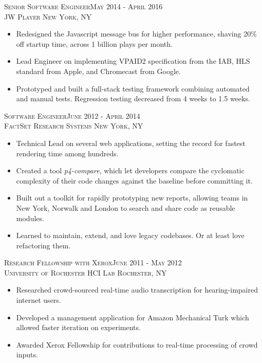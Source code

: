\textsc{Senior Software Engineer\hfill May 2014 - April 2016\\}
\textsc{JW Player \hfill New York, NY\\}
\begin{itemize}
	\setlength{\itemsep}{1pt}
	\setlength{\itemsep}{1pt}
	\setlength{\parskip}{0pt}
	\setlength{\parsep}{0pt}
	\setlength{\leftmargin}{-5mm}
        \item Redesigned the Javascript message bus for higher performance, shaving 20\% off startup time, across 1 billion plays per month.
        \item Lead Engineer on implementing VPAID2 specification from the IAB, HLS standard from Apple, and Chromecast from Google.
        \item Prototyped and built a full-stack testing framework combining automated and manual tests. Regression testing decreased from 4 weeks to 1.5 weeks.
\end{itemize}


\textsc{Software Engineer\hfill June 2012 - April 2014\\}
\textsc{FactSet Research Systems \hfill New York, NY\\}
\begin{itemize}
        \setlength{\itemsep}{1pt}
	\setlength{\parskip}{0pt}
	\setlength{\parsep}{0pt}
	\item Technical Lead on several web applications, setting the record for fastest rendering time among hundreds.
	\item Created a tool \textit{p4-compare}, which let developers compare the cyclomatic complexity of their code
	changes against the baseline before committing it.
	\item Built out a toolkit for rapidly prototyping new reports, allowing teams in New York, Norwalk and London to search and share code as reusable modules.
	\item Learned to maintain, extend, and love legacy codebases. Or at least love refactoring them.
\end{itemize}





\textsc{Research Fellowship with Xerox\hfill June 2011 - May 2012\\}
\textsc{University of Rochester HCI Lab \hfill Rochester, NY\\}
\begin{itemize}
  \setlength{\itemsep}{1pt}
  \setlength{\parskip}{0pt}
  \setlength{\parsep}{0pt}
  \setlength{\leftmargin}{-5mm}
      \item Researched crowd-sourced real-time audio transcription for hearing-impaired internet users.
      \item Developed a management application for Amazon Mechanical Turk which allowed faster iteration on experiments.
      \item Awarded Xerox Fellowship for contributions to real-time processing of crowd inputs.
\end{itemize}

